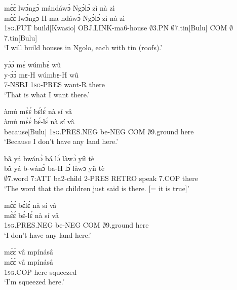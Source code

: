 \begin{exe} 
\exC\label{221} 
  \glll mɛ̀ɛ̀ lwɔ́ngɔ̀ mándáwɔ̀ Ngɔ̀lɔ́ zì nà zì\\
        mɛ̀ɛ̀ lwɔ́ngɔ H-ma-ndáwɔ̀ Ngɔ̀lɔ́ zì nà zì \\
        1\textsc{sg}.FUT build[Kwasio] OBJ.LINK-ma6-house $\emptyset$3.PN $\emptyset$7.tin[Bulu] COM $\emptyset$7.tin[Bulu]  \\
    \trans `I will build houses in Ngolo, each with tin (roofs).'
\end{exe}

\begin{exe} 
\exC\label{222} 
  \glll  yɔ́ɔ̀ mɛ́ wúmbɛ́ wû \\
        y-ɔ́ɔ̀ mɛ-H wúmbɛ-H wû \\
         7-NSBJ 1\textsc{sg}-PRES want-R there \\
    \trans `That is what I want there.'
\end{exe}

\begin{exe} 
\exC\label{223} 
  \glll  àmú mɛ̀ɛ́ bɛ́lɛ́ nà sí vâ \\
         àmú mɛ̀ɛ́ bɛ́-lɛ́ nà sí vâ \\
         because[Bulu] 1\textsc{sg}.PRES.NEG be-NEG COM $\emptyset$9.ground here \\
    \trans `Because I don't have any land here.'
\end{exe}

\begin{exe} 
\exC\label{224} 
  \glll  bã̀ yá bwánɔ̀ bá lɔ́ làwɔ̀ yíì tè \\
         bã̀ yá b-wánɔ̀ ba-H lɔ́ làwɔ yíì tè \\
         $\emptyset$7.word 7:ATT ba2-child 2-PRES RETRO speak 7.COP there \\
    \trans `The word that the children just said is there. [= it is true]'
\end{exe}

\begin{exe} 
\exC\label{225} 
  \glll  mɛ̀ɛ́ bɛ́lɛ́ nà sí vâ \\
         mɛ̀ɛ́ bɛ́-lɛ́ nà sí vâ \\
       1\textsc{sg}.PRES.NEG be-NEG COM $\emptyset$9.ground here   \\
    \trans `I don't have any land here.'
\end{exe}

\begin{exe} 
\exC\label{226}
  \glll mɛ̀ɛ̀ vâ mpínásâ\\
       mɛ̀ɛ̀ vâ mpínásâ \\
        1\textsc{sg}.COP here squeezed  \\
    \trans `I'm squeezed here.'
\end{exe}

